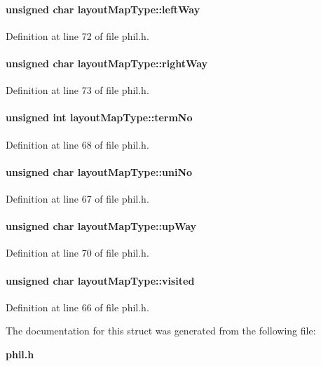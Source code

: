 \paragraph{\setlength{\rightskip}{0pt plus 5cm}unsigned char layout\-Map\-Type::left\-Way}\hfill



Definition at line 72 of file phil.h.\label{layoutMapType_m7}
\paragraph{\setlength{\rightskip}{0pt plus 5cm}unsigned char layout\-Map\-Type::right\-Way}\hfill



Definition at line 73 of file phil.h.\label{layoutMapType_m3}
\paragraph{\setlength{\rightskip}{0pt plus 5cm}unsigned int layout\-Map\-Type::term\-No}\hfill



Definition at line 68 of file phil.h.\label{layoutMapType_m2}
\paragraph{\setlength{\rightskip}{0pt plus 5cm}unsigned char layout\-Map\-Type::uni\-No}\hfill



Definition at line 67 of file phil.h.\label{layoutMapType_m4}
\paragraph{\setlength{\rightskip}{0pt plus 5cm}unsigned char layout\-Map\-Type::up\-Way}\hfill



Definition at line 70 of file phil.h.\label{layoutMapType_m1}
\paragraph{\setlength{\rightskip}{0pt plus 5cm}unsigned char layout\-Map\-Type::visited}\hfill



Definition at line 66 of file phil.h.

The documentation for this struct was generated from the following file:\begin{CompactItemize}
\item 
{\bf phil.h}\end{CompactItemize}
